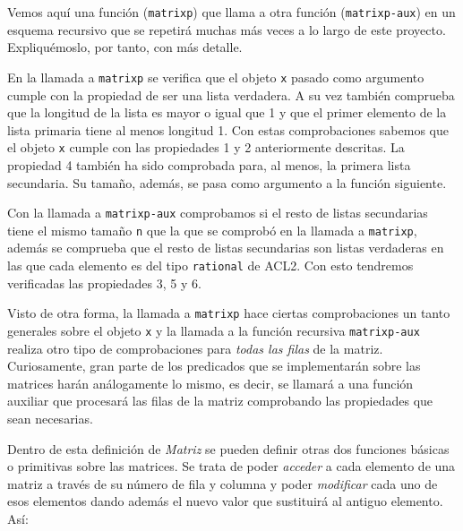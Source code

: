 \documentclass[a4paper,10pt]{article}
\begin{document}
\par \vspace{10pt}

Vemos aquí una función (\texttt{matrixp}) que llama a otra función (\texttt{matrixp-aux}) en un esquema recursivo que se repetirá muchas más veces a lo largo de este proyecto. Expliquémoslo, por tanto, con más detalle.

\par \vspace{10pt}

En la llamada a \texttt{matrixp} se verifica que el objeto \texttt{x} pasado como argumento cumple con la propiedad de ser una lista verdadera. A su vez también comprueba que la longitud de la lista es mayor o igual que 1 y que el primer elemento de la lista primaria tiene al menos longitud 1. Con estas comprobaciones sabemos que el objeto \texttt{x} cumple con las propiedades 1 y 2 anteriormente descritas. La propiedad 4 también ha sido comprobada para, al menos, la primera lista secundaria. Su tamaño, además, se pasa como argumento a la función siguiente.

\par \vspace{10pt}

Con la llamada a \texttt{matrixp-aux} comprobamos si el resto de listas secundarias tiene el mismo tamaño \texttt{n} que la que se comprobó en la llamada a \texttt{matrixp}, además se comprueba que el resto de listas secundarias son listas verdaderas en las que cada elemento es del tipo \texttt{rational} de ACL2. Con esto tendremos verificadas las propiedades 3, 5 y 6.

\par \vspace{10pt}

Visto de otra forma, la llamada a \texttt{matrixp} hace ciertas comprobaciones un tanto generales sobre el objeto \texttt{x} y la llamada a la función recursiva \texttt{matrixp-aux} realiza otro tipo de comprobaciones para \emph{todas las filas} de la matriz. Curiosamente, gran parte de los predicados que se implementarán sobre las matrices harán análogamente lo mismo, es decir, se llamará a una función auxiliar que procesará las filas de la matriz comprobando las propiedades que sean necesarias.

\par \vspace{10pt}

Dentro de esta definición de \emph{Matriz} se pueden definir otras dos funciones básicas o primitivas sobre las matrices. Se trata de poder \emph{acceder} a cada elemento de una matriz a través de su número de fila y columna y poder \emph{modificar} cada uno de esos elementos dando además el nuevo valor que sustituirá al antiguo elemento. Así:
\end{document}
